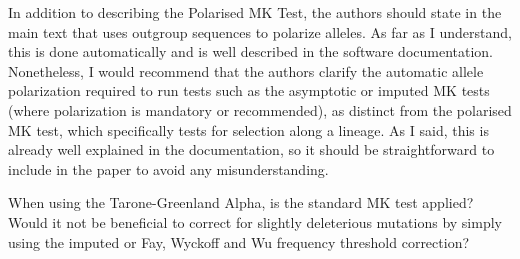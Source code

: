 \begin{point}{} %
In addition to describing the Polarised MK Test, the authors should
state in the main text that \mkado uses outgroup sequences to polarize
alleles. As far as I understand, this is done automatically and is
well described in the software documentation. Nonetheless, I would
recommend that the authors clarify the automatic allele polarization
required to run tests such as the asymptotic or imputed MK tests
(where polarization is mandatory or recommended), as distinct from the
polarised MK test, which specifically tests for selection along a
lineage. As I said, this is already well explained in the
documentation, so it should be straightforward to include in the paper
to avoid any misunderstanding.
\end{point}


\begin{point}{} %
When using the Tarone-Greenland Alpha, is the standard MK test
applied? Would it not be beneficial to correct for slightly deleterious
mutations by simply using the imputed or Fay, Wyckoff and Wu frequency
threshold correction?
\end{point}

